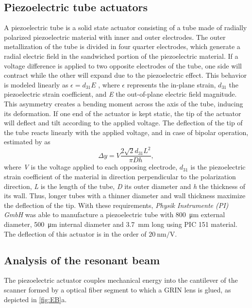 \documentclass[10pt]{iopart}
\begin{document}
\subsection{Piezoelectric tube actuators}
\label{ssec:piezo}
A piezoelectric tube is a solid state actuator consisting of a tube made of radially polarized piezoelectric material with inner and outer electrodes. The outer metallization of the tube is divided in four quarter electrodes, which generate a radial electric field in the sandwiched portion of the piezoelectric material. If a voltage difference is applied to two opposite electrodes of the tube, one side will contract while the other will expand due to the piezoelectric effect. This behavior is modeled linearly  as $\epsilon = d_{31} E$ \cite{Arnau2008}, where $\epsilon$ represents the in-plane strain, $d_{31}$ the piezoelectric strain coefficient, and \textit{E} the out-of-plane electric field magnitude. This asymmetry creates a bending moment across the axis of the tube, inducing its deformation. If one end of the actuator is kept static, the tip of the actuator will deflect and tilt according to the applied voltage. The deflection of the tip of the tube reacts linearly with the applied voltage, and in case of bipolar operation, estimated by \cite{Chen} as
\begin{equation}
\Delta y = V  \frac{2 \sqrt{2} d_{31} L^2}{\pi D h},
\end{equation}
where \textit{V} is the voltage applied to each opposing electrode, $d_{31}$ is the piezoelectric strain coefficient of the material in direction perpendicular to the polarization direction, \textit{L} is the length of the tube, \textit{D} its outer diameter and \textit{h} the thickness of its wall. Thus, longer tubes with a thinner diameter and wall thickness maximize the deflection of the tip. With these requirements, \textit{Physik Instrumente (PI) GmbH} was able to manufacture a piezoelectric tube with \SI{800}{\micro\meter} external diameter, \SI{500}{\micro\meter} internal diameter and \SI{3.7}{\milli\meter} long using PIC 151 material. The deflection of this actuator is in the order of $\SI{20}{\nano\meter / \volt}$.

\subsection{Analysis of the resonant beam}
\label{ssec:EB}
The piezoelectric actuator couples mechanical energy into the cantilever of the scanner formed by a optical fiber segment to which a GRIN lens is glued, as depicted in \autoref{fig:EB}a.
\end{document}
